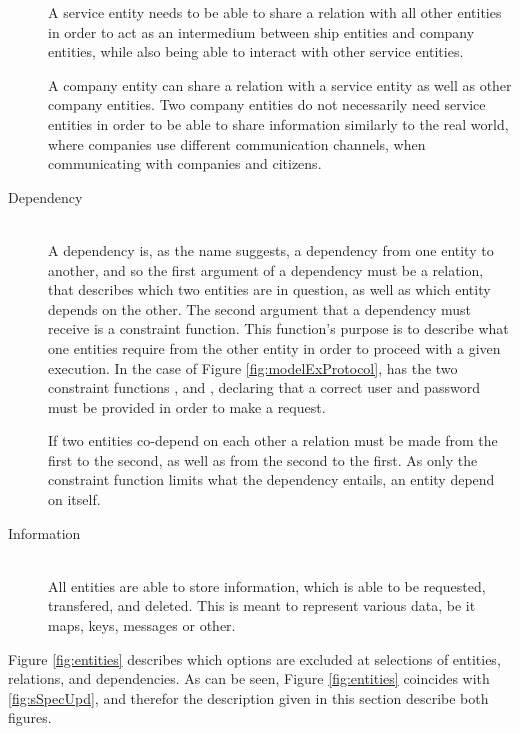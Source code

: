 \begin{description}
		A service entity needs to be able to share a relation with all other entities in order to act as an intermedium between ship entities and company entities, while also being able to interact with other service entities.

		A company entity can share a relation with a service entity as well as other company entities. Two company entities do not necessarily need service entities in order to be able to share information similarly to the real world, where companies use different communication channels, when communicating with companies and citizens.
	\item[Dependency]\ \\
		A dependency is, as the name suggests, a dependency from one entity to another, and so the first argument of a dependency must be a relation, that describes which two entities are in question, as well as which entity depends on the other. The second argument that a dependency must receive is a constraint function. This function's purpose is to describe what one entities require from the other entity in order to proceed with a given execution. In the case of Figure \ref{fig:modelExProtocol},  has the two constraint functions , and , declaring that a correct user and password must be provided in order to make a request. 

		If two entities co-depend on each other a relation must be made from the first to the second, as well as from the second to the first. As only the constraint function limits what the dependency entails, an entity  depend on itself.
	\item[Information]\ \\
		All entities are able to store information, which is able to be requested, transfered, and deleted. This is meant to represent various data, be it maps, keys, messages or other.
\end{description}
\noindent
Figure \ref{fig:entities} describes which options are excluded at selections of entities, relations, and dependencies. As can be seen, Figure \ref{fig:entities} coincides with \ref{fig:sSpecUpd}, and therefor the description given in this section describe both figures. 

